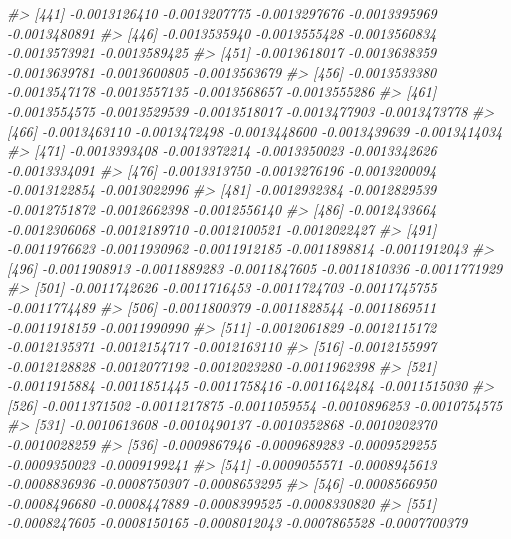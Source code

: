 \documentclass[
]{article}
\newenvironment{Shaded}{\begin{snugshade}}{\end{snugshade}}
\newcommand{\CommentTok}[1]{\textcolor[rgb]{0.56,0.35,0.01}{\textit{#1}}}
\begin{document}
\begin{Shaded}
\begin{Highlighting}[]
\CommentTok{\#\textgreater{} [441] {-}0.0013126410 {-}0.0013207775 {-}0.0013297676 {-}0.0013395969 {-}0.0013480891}
\CommentTok{\#\textgreater{} [446] {-}0.0013535940 {-}0.0013555428 {-}0.0013560834 {-}0.0013573921 {-}0.0013589425}
\CommentTok{\#\textgreater{} [451] {-}0.0013618017 {-}0.0013638359 {-}0.0013639781 {-}0.0013600805 {-}0.0013563679}
\CommentTok{\#\textgreater{} [456] {-}0.0013533380 {-}0.0013547178 {-}0.0013557135 {-}0.0013568657 {-}0.0013555286}
\CommentTok{\#\textgreater{} [461] {-}0.0013554575 {-}0.0013529539 {-}0.0013518017 {-}0.0013477903 {-}0.0013473778}
\CommentTok{\#\textgreater{} [466] {-}0.0013463110 {-}0.0013472498 {-}0.0013448600 {-}0.0013439639 {-}0.0013414034}
\CommentTok{\#\textgreater{} [471] {-}0.0013393408 {-}0.0013372214 {-}0.0013350023 {-}0.0013342626 {-}0.0013334091}
\CommentTok{\#\textgreater{} [476] {-}0.0013313750 {-}0.0013276196 {-}0.0013200094 {-}0.0013122854 {-}0.0013022996}
\CommentTok{\#\textgreater{} [481] {-}0.0012932384 {-}0.0012829539 {-}0.0012751872 {-}0.0012662398 {-}0.0012556140}
\CommentTok{\#\textgreater{} [486] {-}0.0012433664 {-}0.0012306068 {-}0.0012189710 {-}0.0012100521 {-}0.0012022427}
\CommentTok{\#\textgreater{} [491] {-}0.0011976623 {-}0.0011930962 {-}0.0011912185 {-}0.0011898814 {-}0.0011912043}
\CommentTok{\#\textgreater{} [496] {-}0.0011908913 {-}0.0011889283 {-}0.0011847605 {-}0.0011810336 {-}0.0011771929}
\CommentTok{\#\textgreater{} [501] {-}0.0011742626 {-}0.0011716453 {-}0.0011724703 {-}0.0011745755 {-}0.0011774489}
\CommentTok{\#\textgreater{} [506] {-}0.0011800379 {-}0.0011828544 {-}0.0011869511 {-}0.0011918159 {-}0.0011990990}
\CommentTok{\#\textgreater{} [511] {-}0.0012061829 {-}0.0012115172 {-}0.0012135371 {-}0.0012154717 {-}0.0012163110}
\CommentTok{\#\textgreater{} [516] {-}0.0012155997 {-}0.0012128828 {-}0.0012077192 {-}0.0012023280 {-}0.0011962398}
\CommentTok{\#\textgreater{} [521] {-}0.0011915884 {-}0.0011851445 {-}0.0011758416 {-}0.0011642484 {-}0.0011515030}
\CommentTok{\#\textgreater{} [526] {-}0.0011371502 {-}0.0011217875 {-}0.0011059554 {-}0.0010896253 {-}0.0010754575}
\CommentTok{\#\textgreater{} [531] {-}0.0010613608 {-}0.0010490137 {-}0.0010352868 {-}0.0010202370 {-}0.0010028259}
\CommentTok{\#\textgreater{} [536] {-}0.0009867946 {-}0.0009689283 {-}0.0009529255 {-}0.0009350023 {-}0.0009199241}
\CommentTok{\#\textgreater{} [541] {-}0.0009055571 {-}0.0008945613 {-}0.0008836936 {-}0.0008750307 {-}0.0008653295}
\CommentTok{\#\textgreater{} [546] {-}0.0008566950 {-}0.0008496680 {-}0.0008447889 {-}0.0008399525 {-}0.0008330820}
\CommentTok{\#\textgreater{} [551] {-}0.0008247605 {-}0.0008150165 {-}0.0008012043 {-}0.0007865528 {-}0.0007700379}

\end{Highlighting}
\end{Shaded}
\end{document}
